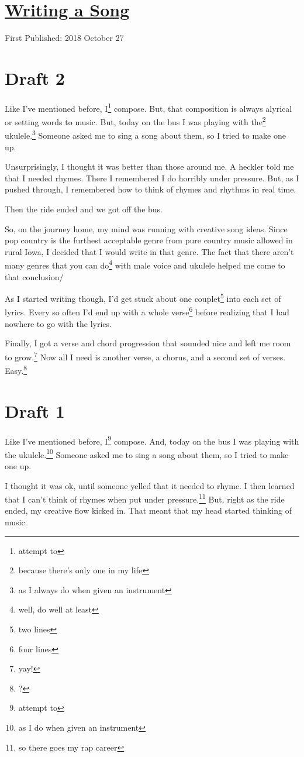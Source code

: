 \documentclass[12pt]{article}[titlepage]
\newcommand{\1}{\={a}}
\newcommand{\2}{\={e}}
\newcommand{\3}{\={\i}}
\newcommand{\4}{\=o}
\newcommand{\5}{\=u}
\newcommand{\6}{\={A}}
\renewcommand{\,}{\textsuperscript{,}}
\begin{document}
\doublespacing
\section{\href{writing-a-song.html}{Writing a Song}}
First Published: 2018 October 27
\section{Draft 2}
Like I've mentioned before, I\footnote{attempt to} compose.
But, that composition is always alyrical or setting words to music.
But, today on the bus I was playing with the\footnote{because there's only one in my life} ukulele.\footnote{as I always do when given an instrument}
Someone asked me to sing a song about them, so I tried to make one up.

Unsurprisingly, I thought it was better than those around me.
A heckler told me that I needed rhymes.
There I remembered I do horribly under pressure.
But, as I pushed through, I remembered how to think of rhymes and rhythms in real time.

Then the ride ended and we got off the bus.

So, on the journey home, my mind was running with creative song ideas.
Since pop country is the furthest acceptable genre from pure country music allowed in rural Iowa, I decided that I would write in that genre.
The fact that there aren't many genres that you can do\footnote{well, do well at least} with male voice and ukulele helped me come to that conclusion/

As I started writing though, I'd get stuck about one couplet\footnote{two lines} into each set of lyrics.
Every so often I'd end up with a whole verse\footnote{four lines} before realizing that I had nowhere to go with the lyrics.

Finally, I got a verse and chord progression that sounded nice and left me room to grow.\footnote{yay!}
Now all I need is another verse, a chorus, and a second set of verses.
Easy.\footnote{?}
\section{Draft 1}
Like I've mentioned before, I\footnote{attempt to} compose.
And, today on the bus I was playing with the ukulele.\footnote{as I do when given an instrument}
Someone asked me to sing a song about them, so I tried to make one up.

I thought it was ok, until someone yelled that it needed to rhyme.
I then learned that I can't think of rhymes when put under pressure.\footnote{so there goes my rap career}
But, right as the ride ended, my creative flow kicked in.
That meant that my head started thinking of music.
\end{document}

